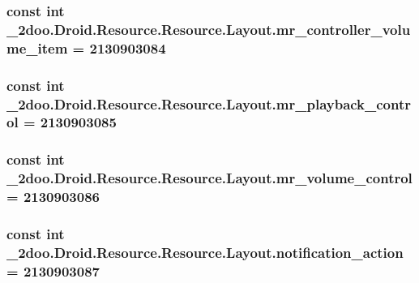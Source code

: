 \hypertarget{class__2doo_1_1_droid_1_1_resource_1_1_layout_9ba1ac0809dc9f0af48d3d65c8b5f90a}{
\subsubsection[{mr\_\-controller\_\-volume\_\-item}]{\setlength{\rightskip}{0pt plus 5cm}const int \_\-2doo.Droid.Resource.Resource.Layout.mr\_\-controller\_\-volume\_\-item = 2130903084}}
\label{class__2doo_1_1_droid_1_1_resource_1_1_layout_9ba1ac0809dc9f0af48d3d65c8b5f90a}


\hypertarget{class__2doo_1_1_droid_1_1_resource_1_1_layout_459b93513aee29b8221c7c4b84080cdb}{
\subsubsection[{mr\_\-playback\_\-control}]{\setlength{\rightskip}{0pt plus 5cm}const int \_\-2doo.Droid.Resource.Resource.Layout.mr\_\-playback\_\-control = 2130903085}}
\label{class__2doo_1_1_droid_1_1_resource_1_1_layout_459b93513aee29b8221c7c4b84080cdb}


\hypertarget{class__2doo_1_1_droid_1_1_resource_1_1_layout_8882eb05207c17349a8b4ec983be989a}{
\subsubsection[{mr\_\-volume\_\-control}]{\setlength{\rightskip}{0pt plus 5cm}const int \_\-2doo.Droid.Resource.Resource.Layout.mr\_\-volume\_\-control = 2130903086}}
\label{class__2doo_1_1_droid_1_1_resource_1_1_layout_8882eb05207c17349a8b4ec983be989a}


\hypertarget{class__2doo_1_1_droid_1_1_resource_1_1_layout_f29f711fc46738a8c451dffabb8e06e5}{
\subsubsection[{notification\_\-action}]{\setlength{\rightskip}{0pt plus 5cm}const int \_\-2doo.Droid.Resource.Resource.Layout.notification\_\-action = 2130903087}}
\label{class__2doo_1_1_droid_1_1_resource_1_1_layout_f29f711fc46738a8c451dffabb8e06e5}


